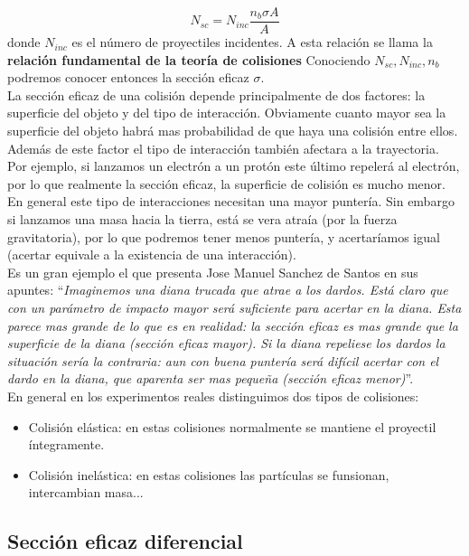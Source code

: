 \documentclass[12pt,a4paper]{book}
\begin{document}
\begin{equation}
N_{sc} = N_{inc} \dfrac{n_b \sigma A}{A}
\end{equation}
donde $N_{inc}$ es el número de proyectiles incidentes. A esta relación se llama la \textbf{relación fundamental de la teoría de colisiones}  Conociendo $N_{sc}, N_{inc}, n_b$ podremos conocer entonces la sección eficaz $\sigma$. \\

La sección eficaz de una colisión depende principalmente de dos factores: la superficie del objeto y del tipo de interacción. Obviamente cuanto mayor sea la superficie del objeto habrá mas probabilidad de que haya una colisión entre ellos. Además de este factor el tipo de interacción también afectara a la trayectoria. Por ejemplo, si lanzamos un electrón a un protón este último repelerá al electrón, por lo que realmente la sección eficaz, la superficie de colisión es mucho menor. En general este tipo de interacciones necesitan una mayor puntería. Sin embargo si lanzamos una masa hacia la tierra, está se vera atraía (por la fuerza gravitatoria), por lo que podremos tener menos puntería, y acertaríamos igual (acertar equivale a la existencia de una interacción).\\
 
Es un gran ejemplo el que presenta Jose Manuel Sanchez de Santos en sus apuntes: ``\textit{Imaginemos una diana trucada que atrae a los dardos. Está claro que con un parámetro de impacto mayor será suficiente para acertar en la diana. Esta parece mas grande de lo que es en realidad: la sección eficaz es mas grande que la superficie de la diana (sección eficaz mayor). Si la diana repeliese los dardos la situación sería la contraria: aun con buena puntería será difícil acertar con el dardo en la diana, que aparenta ser mas pequeña (sección eficaz menor)}''. \\

En general en los experimentos reales distinguimos dos tipos de colisiones:

\begin{itemize}
\item Colisión elástica: en estas colisiones normalmente se mantiene el proyectil íntegramente.
\item Colisión inelástica: en estas colisiones las partículas se funsionan, intercambian masa...
\end{itemize}

\subsection{Sección eficaz diferencial}
\end{document}
